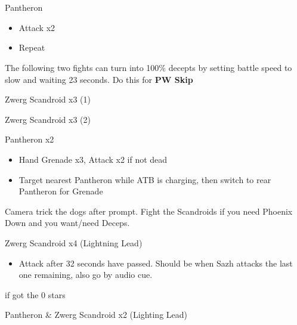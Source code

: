 \chapter[Chapter 2]{}

\begin{multicols}{2}
\begin{battle}{Pantheron}
\begin{itemize}
    \item Attack x2
    \item Repeat
\end{itemize}
\end{battle}

The following two fights can turn into 100\% decepts by setting battle speed to slow and waiting 23 seconds. Do this for {\bf PW Skip}
\begin{battle}{Zwerg Scandroid x3 (1)}
\end{battle}

\begin{battle}{Zwerg Scandroid x3 (2)}
\end{battle}

\begin{battle}{Pantheron x2}
\begin{itemize}
    \item Hand Grenade x3, Attack x2 if not dead
    \item Target nearest Pantheron while ATB is charging, then switch to rear Pantheron for Grenade
\end{itemize}
\end{battle}

Camera trick the dogs after prompt. Fight the Scandroids if you need Phoenix Down and you want/need Deceps.

\begin{battle}{Zwerg Scandroid x4 (Lightning Lead)}
\begin{itemize}
    \item Attack after 32 seconds have passed. Should be when Sazh attacks the last one remaining, also go by audio cue.
\end{itemize}
 if got the 0 stars
\end{battle}


\begin{battle}{Pantheron \& Zwerg Scandroid x2 (Lighting Lead)}
\end{battle}


\end{multicols}

